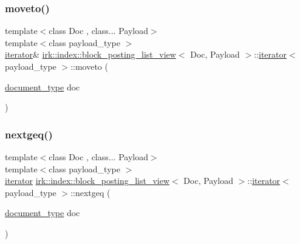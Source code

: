 \subsubsection{\texorpdfstring{moveto()}{moveto()}}
{\footnotesize\ttfamily template$<$class Doc , class... Payload$>$ \\
template$<$class payload\+\_\+type $>$ \\
\mbox{\hyperlink{classirk_1_1index_1_1block__posting__list__view_1_1iterator}{iterator}}\& \mbox{\hyperlink{classirk_1_1index_1_1block__posting__list__view}{irk\+::index\+::block\+\_\+posting\+\_\+list\+\_\+view}}$<$ Doc, Payload $>$\+::\mbox{\hyperlink{classirk_1_1index_1_1block__posting__list__view_1_1iterator}{iterator}}$<$ payload\+\_\+type $>$\+::moveto (\begin{DoxyParamCaption}\item[{\mbox{\hyperlink{classirk_1_1index_1_1block__posting__list__view_a4a778116d22c9cf347f38da132ca0900}{document\+\_\+type}}}]{doc }\end{DoxyParamCaption})\hspace{0.3cm}{\ttfamily [inline]}}

\mbox{\label{classirk_1_1index_1_1block__posting__list__view_1_1iterator_ab330da1b4a727e2afadb5469fc80e4f0}} 
\subsubsection{\texorpdfstring{nextgeq()}{nextgeq()}}
{\footnotesize\ttfamily template$<$class Doc , class... Payload$>$ \\
template$<$class payload\+\_\+type $>$ \\
\mbox{\hyperlink{classirk_1_1index_1_1block__posting__list__view_1_1iterator}{iterator}} \mbox{\hyperlink{classirk_1_1index_1_1block__posting__list__view}{irk\+::index\+::block\+\_\+posting\+\_\+list\+\_\+view}}$<$ Doc, Payload $>$\+::\mbox{\hyperlink{classirk_1_1index_1_1block__posting__list__view_1_1iterator}{iterator}}$<$ payload\+\_\+type $>$\+::nextgeq (\begin{DoxyParamCaption}\item[{\mbox{\hyperlink{classirk_1_1index_1_1block__posting__list__view_a4a778116d22c9cf347f38da132ca0900}{document\+\_\+type}}}]{doc }\end{DoxyParamCaption})\hspace{0.3cm}{\ttfamily [inline]}}

